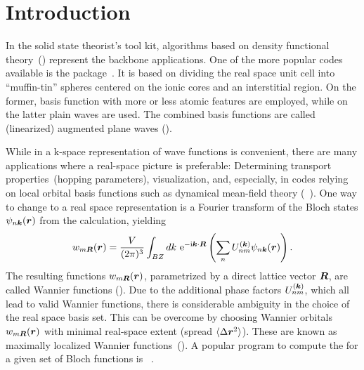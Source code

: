 


\frontmatter
\maketitle

\chapter*{Introduction}
\label{sec:introduction}


In the solid state theorist's tool kit, algorithms based on density
functional theory~(\dft) represent the backbone applications.  One of
the more popular codes available is the \wien
package~\cite{wien2k_orig,wien2k}.  It is based on dividing the real
space unit cell into ``muffin-tin'' spheres centered on the ionic
cores and an interstitial region.  On the former, basis function with
more or less atomic features are employed, while on the latter plain
waves are used.  The combined basis functions are called (linearized)
augmented plane waves (\lapw).

While in \wien a k-space representation of wave functions is
convenient, there are many applications where a real-space picture is
preferable: Determining transport properties~(hopping parameters),
visualization, and, especially, in codes relying on local orbital
basis functions such as dynamical mean-field theory
(\dmft~\cite{dmft}). One way to change to a real space representation
is a Fourier transform of the Bloch states $\psi_{n\boldsymbol{k}}(\boldsymbol{r})$
from the \dft calculation, yielding
%
\begin{gather*}
  w_{m\boldsymbol{R}}(\boldsymbol{r})=
  \frac{V}{(2\pi)^3}
  \int_{BZ} dk\ \text{e}^{-\text{i}\boldsymbol{k}\cdot\boldsymbol{R}}
  \left(\sum_nU^{(\boldsymbol{k})}_{nm}
    \psi_{n\boldsymbol{k}}(\boldsymbol{r})\right).
\end{gather*}
%
The resulting functions $w_{m\boldsymbol{R}}(\boldsymbol{r})$, parametrized by a
direct lattice vector $\boldsymbol{R}$, are called Wannier functions
(\wf). Due to the additional phase factors $U^{(\boldsymbol{k})}_{nm}$, which
all lead to valid Wannier functions, there is considerable ambiguity
in the choice of the real space basis set.  This can be overcome by
choosing Wannier orbitals $w_{m\boldsymbol{R}}(\boldsymbol{r})$ with minimal
real-space extent (spread $\langle\Delta \boldsymbol{r}^2\rangle$).  These are
known as maximally localized Wannier functions~(\mlwf). A popular
program to compute the \mlwf for a given set of Bloch functions is
\wannier~\cite{wannier90_orig,wannier90}.

